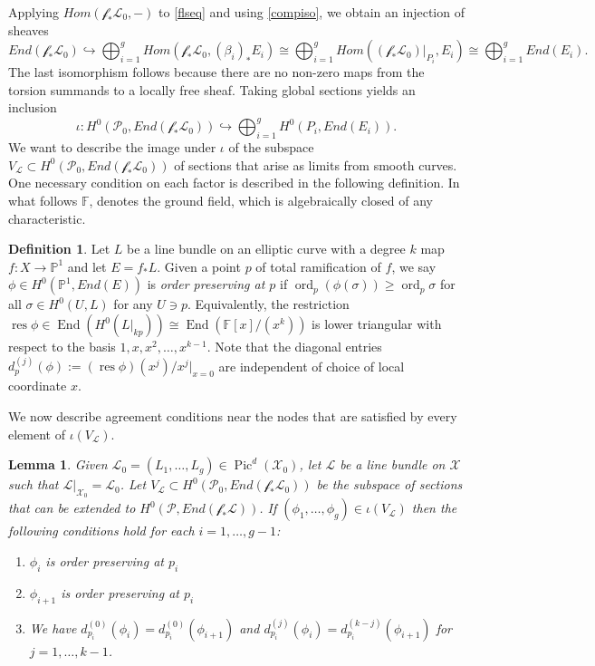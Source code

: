 \documentclass[12pt]{amsart}
\newcommand{\cc}{\mathbb{F}}
\newcommand{\pp}{\mathbb{P}}
\renewcommand{\P}{\mathcal{P}}
\renewcommand{\L}{\mathcal{L}}
\newcommand{\X}{\mathcal{X}}
\newcommand{\f}{\mathcal{f}}
\newtheorem{Lemma}[theorem]{Lemma}
\DeclareMathOperator{\Pic}{Pic}
\DeclareMathOperator{\End}{End}
\DeclareMathOperator{\res}{res}
\DeclareMathOperator{\ord}{ord}
\theoremstyle{definition}
\newtheorem{Definition}[theorem]{Definition}
\theoremstyle{remark}
\theoremstyle{remark}
\numberwithin{equation}{section}
\begin{document}
Applying $Hom(\f_*\L_0, -)$ to \eqref{flseq} and using \eqref{compiso}, we obtain an injection of sheaves
\[End(\f_*\L_0) \hookrightarrow \bigoplus_{i = 1}^g Hom(\f_*\L_0, (\beta_i)_*E_i) \cong \bigoplus_{i=1}^g Hom((\f_*\L_0)|_{P_i}, E_i) \cong \bigoplus_{i=1}^g End(E_i).\]
The last isomorphism follows because there are no non-zero maps from the torsion summands to a locally free sheaf.
Taking global sections yields an inclusion
\[ \iota: H^0(\P_0, End(\f_*\L_0)) \hookrightarrow \bigoplus_{i=1}^g H^0(P_i, End(E_i)).\]
We want to describe the image under $\iota$ of the subspace $V_\L \subset H^0(\P_0, End(\f_*\L_0))$ of sections that arise as limits from smooth curves. One necessary condition on each factor is described in the following definition. In what follows $\cc$, denotes the ground field, which is algebraically closed of any characteristic.
\begin{Definition}
Let $L$ be a line bundle on an elliptic curve with a degree $k$ map $f\colon  X \rightarrow \pp^1$ and let $E = f_* L$. Given a point $p$ of total ramification of $f$,
we say $\phi \in H^0(\pp^1, End(E))$ is \textit{order preserving at $p$} if $\ord_p(\phi(\sigma)) \geq \ord_p \sigma$ for all $\sigma \in H^0(U, L)$ for any $U \ni p$. Equivalently, the restriction $\res \phi \in \End(H^0(L|_{kp})) \cong \End(\cc[x]/(x^k))$ is lower triangular with respect to the basis $1, x, x^2, \ldots, x^{k-1}$. 
Note that the diagonal entries $d_{p}^{(j)}(\phi) := (\res \phi)(x^j)/x^j|_{x=0}$ are independent of choice of local coordinate $x$.
\end{Definition}

We now describe agreement conditions near the nodes that are satisfied by every element of $\iota(V_\L)$.
 \begin{Lemma} \label{cond}
Given $\L_0 = (L_1, \ldots, L_g) \in \Pic^d(\X_0)$, let $\L$ be a line bundle on $\X$ such that $\L|_{\X_0} = \L_0$.
Let $V_\L \subset H^0(\P_0, End(\f_*\L_0))$ be the subspace of sections that can be extended to $H^0(\P, End(\f_*\L))$.
If $(\phi_1, \ldots, \phi_g) \in \iota(V_\L)$ then the following conditions hold for each $i=1, \ldots, g-1$:
\begin{enumerate}
\item \label{x} $\phi_i$ is order preserving at $p_i$
\item \label{y} $\phi_{i+1}$ is order preserving at $p_i$
\item \label{d} We have $d_{p_i}^{(0)}(\phi_i) = d_{p_i}^{(0)}(\phi_{i+1})$ and $d_{p_i}^{(j)}(\phi_i) = d_{p_i}^{(k-j)}(\phi_{i+1})$ for $j = 1, \ldots, k-1$.
 \end{enumerate}
 \end{Lemma}
 
\end{document}
